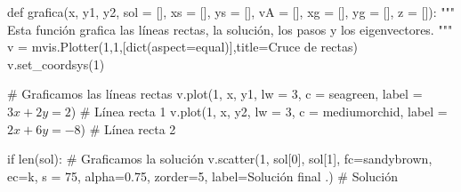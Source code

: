 \documentclass[
  letterpaper,
  DIV=11,
  numbers=noendperiod]{scrreprt}
\newenvironment{Shaded}{\begin{snugshade}}{\end{snugshade}}
\newcommand{\BuiltInTok}[1]{\textcolor[rgb]{0.00,0.23,0.31}{#1}}
\newcommand{\CommentTok}[1]{\textcolor[rgb]{0.37,0.37,0.37}{#1}}
\newcommand{\ControlFlowTok}[1]{\textcolor[rgb]{0.00,0.23,0.31}{#1}}
\newcommand{\DecValTok}[1]{\textcolor[rgb]{0.68,0.00,0.00}{#1}}
\newcommand{\FloatTok}[1]{\textcolor[rgb]{0.68,0.00,0.00}{#1}}
\newcommand{\KeywordTok}[1]{\textcolor[rgb]{0.00,0.23,0.31}{#1}}
\newcommand{\NormalTok}[1]{\textcolor[rgb]{0.00,0.23,0.31}{#1}}
\newcommand{\OperatorTok}[1]{\textcolor[rgb]{0.37,0.37,0.37}{#1}}
\newcommand{\StringTok}[1]{\textcolor[rgb]{0.13,0.47,0.30}{#1}}
\begin{document}
\begin{Shaded}
\begin{Highlighting}[]
\KeywordTok{def}\NormalTok{ grafica(x, y1, y2, sol }\OperatorTok{=}\NormalTok{ [], xs }\OperatorTok{=}\NormalTok{ [], ys }\OperatorTok{=}\NormalTok{ [], vA }\OperatorTok{=}\NormalTok{ [], xg }\OperatorTok{=}\NormalTok{ [], yg }\OperatorTok{=}\NormalTok{ [], z }\OperatorTok{=}\NormalTok{ []):}
    \CommentTok{"""}
\CommentTok{    Esta función grafica las líneas rectas, la solución, los pasos y los eigenvectores.}
\CommentTok{    """}
\NormalTok{    v }\OperatorTok{=}\NormalTok{ mvis.Plotter(}\DecValTok{1}\NormalTok{,}\DecValTok{1}\NormalTok{,[}\BuiltInTok{dict}\NormalTok{(aspect}\OperatorTok{=}\StringTok{\textquotesingle{}equal\textquotesingle{}}\NormalTok{)],title}\OperatorTok{=}\StringTok{\textquotesingle{}Cruce de rectas\textquotesingle{}}\NormalTok{) }
\NormalTok{    v.set\_coordsys(}\DecValTok{1}\NormalTok{)}
    
    \CommentTok{\# Graficamos las líneas rectas}
\NormalTok{    v.plot(}\DecValTok{1}\NormalTok{, x, y1, lw }\OperatorTok{=} \DecValTok{3}\NormalTok{, c }\OperatorTok{=} \StringTok{\textquotesingle{}seagreen\textquotesingle{}}\NormalTok{, label }\OperatorTok{=} \StringTok{\textquotesingle{}$3x+2y=2$\textquotesingle{}}\NormalTok{) }\CommentTok{\# Línea recta 1}
\NormalTok{    v.plot(}\DecValTok{1}\NormalTok{, x, y2, lw }\OperatorTok{=} \DecValTok{3}\NormalTok{, c }\OperatorTok{=} \StringTok{\textquotesingle{}mediumorchid\textquotesingle{}}\NormalTok{, label }\OperatorTok{=} \StringTok{\textquotesingle{}$2x+6y={-}8$\textquotesingle{}}\NormalTok{) }\CommentTok{\# Línea recta 2}

    \ControlFlowTok{if} \BuiltInTok{len}\NormalTok{(sol):}
        \CommentTok{\# Graficamos la solución}
\NormalTok{        v.scatter(}\DecValTok{1}\NormalTok{, sol[}\DecValTok{0}\NormalTok{], sol[}\DecValTok{1}\NormalTok{], fc}\OperatorTok{=}\StringTok{\textquotesingle{}sandybrown\textquotesingle{}}\NormalTok{, ec}\OperatorTok{=}\StringTok{\textquotesingle{}k\textquotesingle{}}\NormalTok{, s }\OperatorTok{=} \DecValTok{75}\NormalTok{, alpha}\OperatorTok{=}\FloatTok{0.75}\NormalTok{, zorder}\OperatorTok{=}\DecValTok{5}\NormalTok{, label}\OperatorTok{=}\StringTok{\textquotesingle{}Solución final         .\textquotesingle{}}\NormalTok{) }\CommentTok{\# Solución}


\end{Highlighting}
\end{Shaded}
\end{document}
